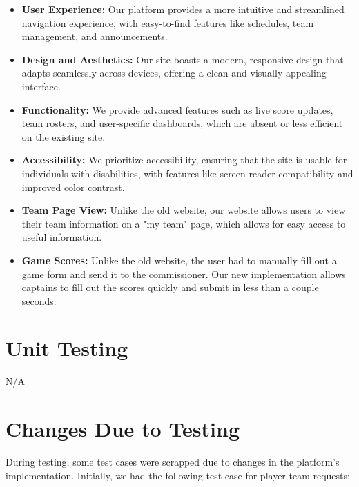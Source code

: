 \documentclass[12pt, titlepage]{article}
\begin{document}
    \begin{itemize}
        \item \textbf{User Experience:} Our platform provides a more intuitive and streamlined navigation experience, with easy-to-find features like schedules, team management, and announcements.
        \item \textbf{Design and Aesthetics:} Our site boasts a modern, responsive design that adapts seamlessly across devices, offering a clean and visually appealing interface.
        \item \textbf{Functionality:} We provide advanced features such as live score updates, team rosters, and user-specific dashboards, which are absent or less efficient on the existing site.
        \item \textbf{Accessibility:} We prioritize accessibility, ensuring that the site is usable for individuals with disabilities, with features like screen reader compatibility and improved color contrast.
         \item \textbf{Team Page View:} Unlike the old website, our website allows users to view their team information on a "my team" page, which allows for easy access to useful information.
         \item \textbf{Game Scores:} Unlike the old website, the user had to manually fill out a game form and send it to the commissioner. Our new implementation allows captains to fill out the scores quickly and submit in less than a couple seconds.
    \end{itemize}

\section{Unit Testing}
N/A

\section{Changes Due to Testing}


During testing, some test cases were scrapped due to changes in the platform's implementation. Initially, we had the following test case for player team requests:\\
\end{document}
